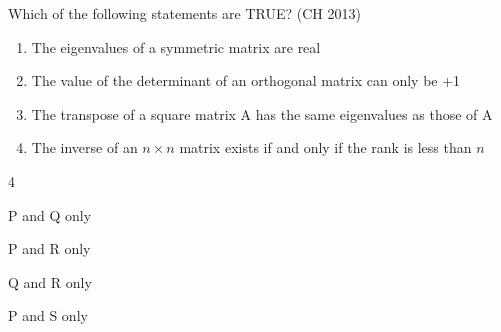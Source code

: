 		\item Which of the following statements are TRUE?
			\hfill (CH 2013)
			\begin{enumerate}[label=\Alph*:, start=16]
			
			\item The eigenvalues of a symmetric matrix are real
			\item The value of the determinant of an orthogonal matrix can only be +1
			\item The transpose of a square matrix A has the same eigenvalues as those of A
			\item The inverse of an $n\times n$ matrix exists if and only if the rank is less than $n$
		\end{enumerate}
		\begin{enumerate}
		\end{enumerate}
